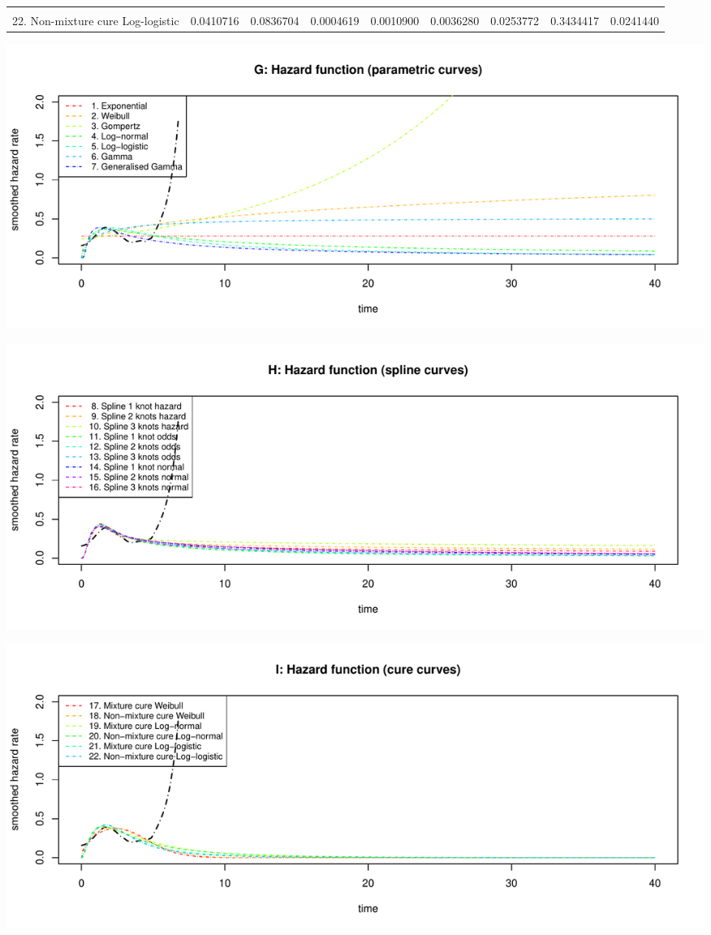 \documentclass[
]{article}
\begin{document}
\begin{table}
{\begin{tabular}[t]{lrrrrrrrr}
\cellcolor{gray!6}{21. Mixture cure Log-logistic} & \cellcolor{gray!6}{0.0439682} & \cellcolor{gray!6}{0.0847543} & \cellcolor{gray!6}{0.0005930} & \cellcolor{gray!6}{0.0014141} & \cellcolor{gray!6}{0.0047437} & \cellcolor{gray!6}{0.0321531} & \cellcolor{gray!6}{0.3414361} & \cellcolor{gray!6}{0.0305649}\\
22. Non-mixture cure Log-logistic & 0.0410716 & 0.0836704 & 0.0004619 & 0.0010900 & 0.0036280 & 0.0253772 & 0.3434417 & 0.0241440\\
\bottomrule
\end{tabular}}
\end{table}

\begin{flushleft}\includegraphics[height=0.29\textheight]{Images/validate_extrapolation3-7} \end{flushleft}

\begin{flushleft}\includegraphics[height=0.29\textheight]{Images/validate_extrapolation3-8} \end{flushleft}

\begin{flushleft}\includegraphics[height=0.29\textheight]{Images/validate_extrapolation3-9} \end{flushleft}
\end{document}

